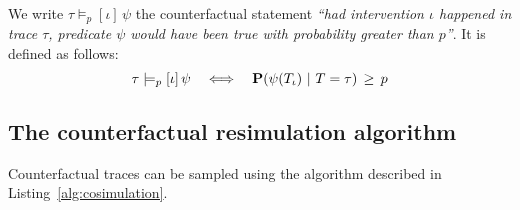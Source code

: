 \begin{definition} We write
  $\tau \models_p [\iota] \, \psi$ the counterfactual statement
  \textit{``had intervention $\iota$ happened in trace $\tau$,
    predicate $\psi$ would have been true with probability greater
    than $p$''}.  It is defined as follows:
  \[ \tau \models_p [\iota] \, \psi \quad \Longleftrightarrow \quad
    \mathbf{P}( \psi({T_\iota}{}) \ |\ T = \tau) \,\geq\, p \]
\end{definition}

\subsection{The counterfactual resimulation algorithm}

Counterfactual traces can be sampled using the algorithm described in
Listing~\ref{alg:cosimulation}.



